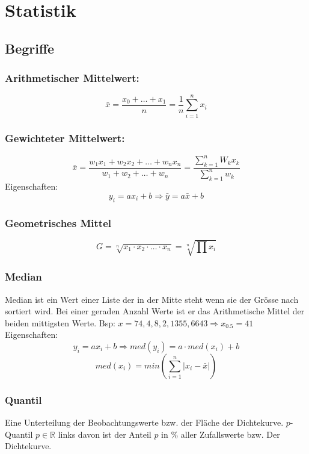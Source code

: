 \documentclass[margin=normal]{tex/hsrzf}
\begin{document}
\section{Statistik}
\begin{multicols}{2}

    \subsection{Begriffe}
    \subsubsection*{Arithmetischer Mittelwert:}
    $$\bar{x} = \frac{x_0 + \dots + x_1}{n} = \frac{1}{n} \sum_{i=1}^n x_i $$
    \subsubsection*{Gewichteter Mittelwert:}
    $$\bar{x} = \frac{w_1x_1 + w_2x_2 + \dots + w_nx_n}{w_1 + w_2 + \dots + w_n}
        = \frac{\sum _{k=1}^n W_kx_k}{\sum_{k=1}^n w_k}$$
    Eigenschaften:
    $$y_i = ax_i + b \Rightarrow \bar{y} = a\bar{x} + b$$

    \subsubsection*{Geometrisches Mittel}
    $$G= \sqrt[n]{x_1\cdot x_2\cdot\dots\cdot x_n} = \sqrt[n]{\prod x_i}$$

    \subsubsection*{Median}
    Median ist ein Wert einer Liste der in der Mitte steht wenn sie der Grösse nach sortiert wird.
    Bei einer geraden Anzahl Werte ist er das Arithmetische Mittel der beiden mittigsten Werte.
    Bsp: $x = {74, 4, 8, 2, 1355, 6643} \Rightarrow x_{0.5} = 41$ \\
    Eigenschaften:
    $$y_i = ax_i + b \Rightarrow med(y_i) = a \cdot med(x_i) + b$$
    $$ med(x_i) = min(\sum _{i=1} ^n |x_i - \bar{x}|)$$

    \subsubsection*{Quantil}
    Eine Unterteilung der Beobachtungswerte bzw. der Fläche der Dichtekurve.
    $p$-Quantil $p \in \mathbb{R}$ links davon ist der Anteil $p$ in \% aller Zufallswerte bzw. Der Dichtekurve.
\end{multicols}
\end{document}
